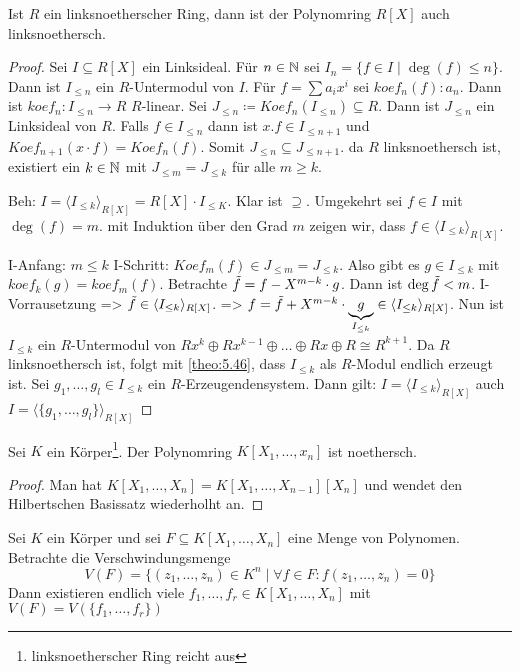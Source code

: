 \documentclass[../main.tex]{subfiles}
\begin{document}
\begin{theorem}
    Ist $R$ ein linksnoetherscher Ring, dann ist der Polynomring $R[X]$ auch linksnoethersch.
\end{theorem}
\begin{proof}
    Sei $I\subseteq R[X]$ ein Linksideal.
    Für $n\in \mathbb{N}$ sei $I_n = \{f\in I\mid \deg(f)\leq n\}$.
    Dann ist $I_{\leq n}$ ein $R$-Untermodul von $I$.
    Für $f=\sum a_i x^i$ sei $koef_n(f)\colon a_n$.
    Dann ist $koef_n: I_{\leq n} \rightarrow R$ $R$-linear.
    Sei $J_{\leq n} \coloneqq Koef_n(I_{\leq n}) \subseteq R$.
    Dann ist $J_{\leq n}$ ein Linksideal von $R$.
    Falls $f\in I_{\leq n}$ dann ist $x.f\in I_{\leq n+1}$ und $Koef_{n+1}(x\cdot f) = Koef_n(f)$.
    Somit $J_{\leq n}\subseteq J_{\leq n+1}$.
    da $R$ linksnoethersch ist, existiert ein $k\in \mathbb{N}$ mit $J_{\leq m} = J_{\leq k}$ für alle $m\geq k$.

    Beh: $I = \langle I_{\leq k}\rangle_{R[X]} = R[X]\cdot I_{\leq K}$.
    Klar ist $\supseteq$.
    Umgekehrt sei $f\in I$ mit $\deg(f)=m$.
    mit Induktion über den Grad $m$ zeigen wir, dass $f\in \langle I_{\leq k}\rangle_{R[X]}$.

    I-Anfang: $m\leq k$ \checkmark
    I-Schritt: $Koef_m(f)\in J_{\leq m} = J_{\leq k}$.
    Also gibt es $g\in I_{\leq k}$ mit $koef_k(g)=koef_m(f)$.
    Betrachte $\Tilde{f} = f- X^{m-k}\cdot g$.
    Dann ist $\deg \Tilde{f}  < m$.
    I-Vorrausetzung => $\Tilde{f}\in \langle I_{\leq k} \rangle_{R[X]}$.
    => $f = \Tilde{f} + X^{m-k} \cdot \underbrace{g}_{I_{\leq k}} \in \langle I_{\leq k}\rangle_{R[X]}$.
    Nun ist $I_{\leq k}$ ein $R$-Untermodul von $R x^k \oplus Rx^{k-1}\oplus \dots \oplus Rx \oplus R\cong R^{k+1}$.
    Da $R$ linksnoethersch ist, folgt mit \ref{theo:5.46}, dass $I_{\leq k}$ als $R$-Modul endlich erzeugt ist.
    Sei $g_1,\dots, g_l\in I_{\leq k}$ ein $R$-Erzeugendensystem.
    Dann gilt: $I=\langle I_{\leq k}\rangle_{R[X]}$ auch $I = \langle\{g_1,\dots,g_l\}\rangle_{R[X]}$
\end{proof}

\begin{corollary}
    Sei $K$ ein Körper\footnote{linksnoetherscher Ring reicht aus}. Der Polynomring $K[X_1,\dots,x_n]$ ist noethersch.
\end{corollary}
\begin{proof}
    Man hat $K[X_1,\dots,X_n] = K[X_1,\dots,X_{n-1}][X_n]$ und wendet den Hilbertschen Basissatz  wiederholht an.
\end{proof}
\begin{corollary} %
    Sei $K$ ein Körper und sei $F\subseteq K[X_1, \dots, X_n]$ eine Menge von Polynomen. Betrachte die Verschwindungsmenge $$V(F) = \{(z_1,\dots,z_n)\in K^n\mid \forall f\in F: f(z_1,\dots,z_n) = 0\}$$
    Dann existieren endlich viele $f_1,\dots,f_r\in K[X_1,\dots,X_n]$ mit $V(F) = V(\{f_1,\dots, f_r\})$
\end{corollary}
\end{document}
